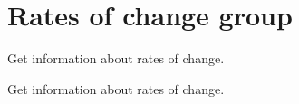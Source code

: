 \hypertarget{group__rate_of_change}{
\section{\-Rates of change group}
\label{group__rate_of_change}
}


\-Get information about rates of change.  


\-Get information about rates of change. 